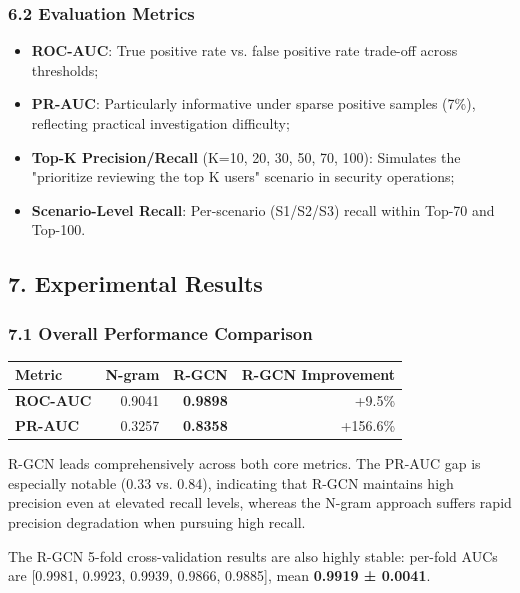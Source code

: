 \documentclass[
  a4paper,
  11pt]{article}
\newcounter{none} %
\providecommand{\tightlist}{%
  \setlength{\itemsep}{0pt}\setlength{\parskip}{0pt}}
\begin{document}
\subsubsection{6.2 Evaluation Metrics}\label{62-evaluation-metrics}

\begin{itemize}
\tightlist
\item
  \textbf{ROC-AUC}: True positive rate vs. false positive rate trade-off
  across thresholds;
\item
  \textbf{PR-AUC}: Particularly informative under sparse positive
  samples (7\%), reflecting practical investigation difficulty;
\item
  \textbf{Top-K Precision/Recall} (K=10, 20, 30, 50, 70, 100): Simulates
  the "prioritize reviewing the top K users" scenario in security
  operations;
\item
  \textbf{Scenario-Level Recall}: Per-scenario (S1/S2/S3) recall within
  Top-70 and Top-100.
\end{itemize}

\subsection{7. Experimental Results}\label{7-experimental-results}

\subsubsection{7.1 Overall Performance
Comparison}\label{71-overall-performance-comparison}

{\def\LTcaptype{none} %
\begin{longtable}[]{@{}lrrr@{}}
\toprule\noalign{}
Metric & N-gram & R-GCN & R-GCN Improvement \\
\midrule\noalign{}
\endhead
\bottomrule\noalign{}
\endlastfoot
\textbf{ROC-AUC} & 0.9041 & \textbf{0.9898} & +9.5\% \\
\textbf{PR-AUC} & 0.3257 & \textbf{0.8358} & +156.6\% \\
\end{longtable}
}

R-GCN leads comprehensively across both core metrics. The PR-AUC gap is
especially notable (0.33 vs. 0.84), indicating that R-GCN maintains high
precision even at elevated recall levels, whereas the N-gram approach
suffers rapid precision degradation when pursuing high recall.

The R-GCN 5-fold cross-validation results are also highly stable:
per-fold AUCs are {[}0.9981, 0.9923, 0.9939, 0.9866, 0.9885{]}, mean
\textbf{0.9919 ± 0.0041}.
\end{document}
